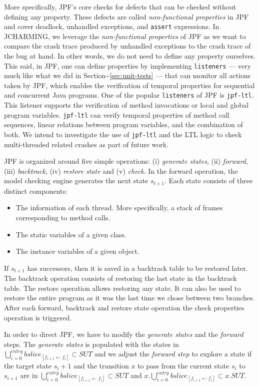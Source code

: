 \documentclass[12pt]{report}
\providecommand{\tightlist}{%
  \setlength{\itemsep}{0pt}\setlength{\parskip}{0pt}}
\begin{document}
More specifically, JPF's core checks for defects that can be checked
without defining any property. These defects are called
\textit{non-functional properties} in JPF and cover deadlock, unhandled
exceptions, and \texttt{assert} expressions. In JCHARMING, we leverage
the \textit{non-functional properties} of JPF as we want to compare the
crash trace produced by unhandled exceptions to the crash trace of the
bug at hand. In other words, we do not need to define any property
ourselves. This said, in JPF, one can define properties by implementing
\texttt{listeners} --- very much like what we did in
Section\textasciitilde{}\ref{sec:unit-tests} --- that can monitor all
actions taken by JPF, which enables the verification of temporal
properties for sequential and concurrent Java programs. One of the
popular \texttt{listeners} of JPF is \texttt{jpf-ltl}. This listener
supports the verification of method invocations or local and global
program variables. \texttt{jpf-ltl} can verify temporal properties of
method call sequences, linear relations between program variables, and
the combination of both. We intend to investigate the use of
\texttt{jpf-ltl} and the LTL logic to check multi-threaded related
crashes as part of future work.

JPF is organized around five simple operations: (i) \emph{generate
states}, (ii) \emph{forward}, (iii) \emph{backtrack}, (iv) \emph{restore
state} and (v) \emph{check}. In the forward operation, the model
checking engine generates the next state \(s_{t+1}\). Each state
consists of three distinct components:

\begin{itemize}
\tightlist
\item
  The information of each thread. More specifically, a stack of frames
  corresponding to method calls.
\item
  The static variables of a given class.
\item
  The instance variables of a given object.
\end{itemize}

If \(s_{t+1}\) has successors, then it is saved in a backtrack table to
be restored later. The backtrack operation consists of restoring the
last state in the backtrack table. The restore operation allows
restoring any state. It can also be used to restore the entire program
as it was the last time we chose between two branches. After each
forward, backtrack and restore state operation the check properties
operation is triggered.

In order to direct JPF, we have to modify the \emph{generate states} and
the \emph{forward} steps. The \emph{generate states} is populated with
the states in
\(\bigcup_{i=0}^{entry} bslice_{[f_{i+1} \leftarrow f_i]} \subset SUT\)
and we adjust the \emph{forward step} to explore a state if the target
state \(s_i+1\) and the transition \(x\) to pass from the current state
\(s_i\) to \(s_{i+1}\) are in
\(\bigcup_{i=0}^{entry} bslice_{[f_{i+1} \leftarrow f_i]} \subset SUT\)
and
\(x.\bigcup_{i=0}^{entry} bslice_{[f_{i+1} \leftarrow f_i]} \subset x.SUT\).
\end{document}
